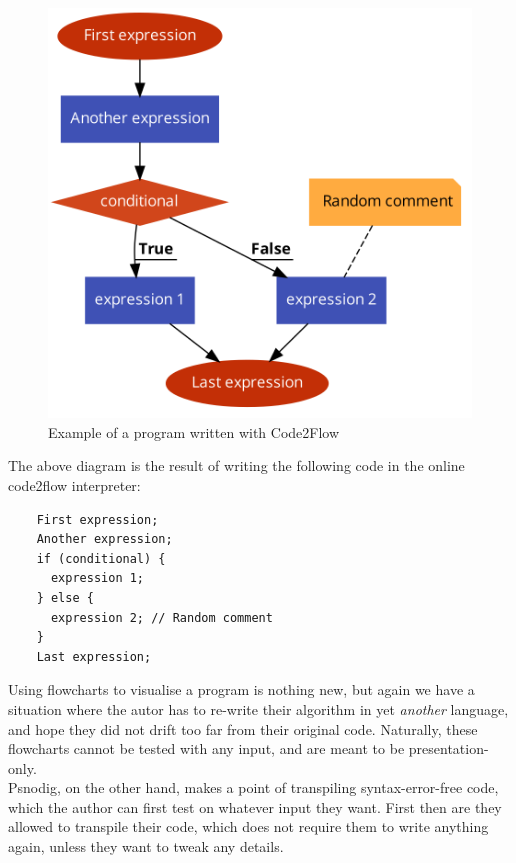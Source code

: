\begin{figure}[ht]
    \centering
    \includegraphics[scale=0.2]{assets/code2flow_example.png}
    \caption{Example of a program written with Code2Flow}
    \label{fig:enter-label}
\end{figure}

The above diagram is the result of writing the following code in the online code2flow interpreter:

\begin{lstlisting}
    First expression;
    Another expression;
    if (conditional) {
      expression 1;
    } else {
      expression 2; // Random comment
    }
    Last expression;
\end{lstlisting}

Using flowcharts to visualise a program is nothing new, but again we have a situation where the autor has to re-write their algorithm in yet \textit{another} language, and hope they did not drift too far from their original code. Naturally, these flowcharts cannot be tested with any input, and are meant to be presentation-only. \hfill \\

Psnodig, on the other hand, makes a point of transpiling syntax-error-free code, which the author can first test on whatever input they want. First then are they allowed to transpile their code, which does not require them to write anything again, unless they want to tweak any details.

